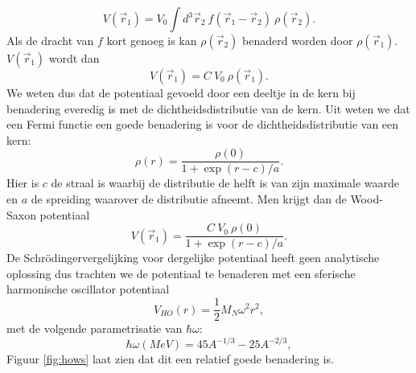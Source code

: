 \documentclass[12pt]{article}
\begin{document}
\begin{equation}
V(\vec{r}_1)  = V_0 \int d^3 \vec{r}_2 \ f(\vec{r}_1 - \vec{r}_2) \ \rho (\vec{r}_2).
\end{equation}
Als de dracht van $f$ kort genoeg is kan $\rho (\vec{r}_2)$ benaderd worden door $\rho (\vec{r}_1)$. $V(\vec{r}_1)$ wordt dan
\begin{equation}
V(\vec{r}_1)  = C\  V_0  \ \rho (\vec{r}_1).
\end{equation} 
We weten dus dat de potentiaal gevoeld door een deeltje in de kern bij benadering everedig is met de dichtheidsdistributie van de kern. Uit \cite{povh2008particles} weten we dat een Fermi functie een goede benadering is voor de dichtheidsdistributie van een kern:
\begin{equation}
\rho (r) = \frac{\rho (0)}{1+\exp{(r-c)/a}}.
\end{equation}
Hier is $c$ de straal is waarbij de distributie de helft is van zijn maximale waarde en $a$ de spreiding waarover de distributie afneemt.
Men krijgt dan de Wood-Saxon potentiaal \cite{povh2008particles}
\begin{equation}
V(\vec{r}_1)  = \frac{C\  V_0  \ \rho (0)}{1+\exp{(r-c)/a}}.
\end{equation}
De Schr\"{o}dingervergelijking voor dergelijke potentiaal heeft geen analytische oplossing dus trachten we de potentiaal te benaderen met een sferische harmonische oscillator potentiaal
\begin{equation}
V_{HO}(r) = \frac{1}{2} M_N \omega^2 r^2,
\end{equation}
met de volgende parametrisatie van $\hbar \omega$:
\begin{equation}
\hbar\omega (MeV) = 45A^{-1/3}-25A^{-2/3},
\end{equation}
Figuur \ref{fig:hows} laat zien dat dit een relatief goede benadering is. 
\end{document}
